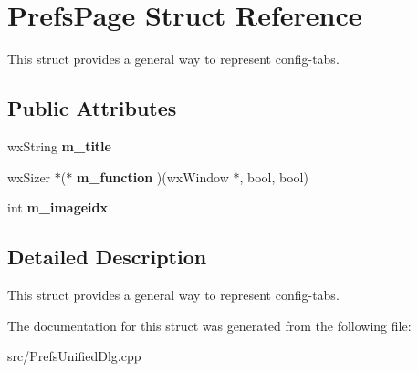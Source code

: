 \section{PrefsPage Struct Reference}
\label{structPrefsPage}


This struct provides a general way to represent config-\/tabs.  
\subsection*{Public Attributes}
\begin{DoxyCompactItemize}
\item 
wxString {\bf m\_\-title}\label{structPrefsPage_add3c7894faeaddb18b79ad230a1f1ea9}

\item 
wxSizer $\ast$($\ast$ {\bf m\_\-function} )(wxWindow $\ast$, bool, bool)\label{structPrefsPage_a8e1bb86ddc179988cae523267cb02cc2}

\item 
int {\bf m\_\-imageidx}\label{structPrefsPage_acce44b4d8f2092eafb63209b411679d5}

\end{DoxyCompactItemize}


\subsection{Detailed Description}
This struct provides a general way to represent config-\/tabs. 

The documentation for this struct was generated from the following file:\begin{DoxyCompactItemize}
\item 
src/PrefsUnifiedDlg.cpp\end{DoxyCompactItemize}
